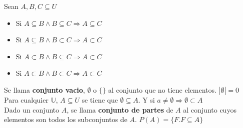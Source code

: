 \documentclass[11pt,a4paper]{article}
\begin{document}
\noindent Sean $A, B, C \subseteq U$
\begin{multicols}{2}
\begin{itemize}
\item Si $A \subseteq B \land B \subseteq C \Rightarrow A \subseteq C$
\item Si $A \subseteq B \land B \subset C \Rightarrow A \subset C$
\item Si $A \subset B \land B \subseteq C \Rightarrow A \subset C$
\item Si $A \subset B \land B \subset C \Rightarrow A \subset C$
\end{itemize}
\end{multicols}

\noindent Se llama \textbf{conjunto vacio}, $\emptyset$ o $\{\}$ al conjunto que no tiene elementos. $|\emptyset| = 0$\\

\noindent Para cualquier $\mathbb{U}$, $A \subseteq U$ se tiene que $\emptyset \subseteq A$. Y si $a \not = \emptyset \Rightarrow \emptyset \subset A$\\


\noindent Dado un conjunto $A$, se llama \textbf{conjunto de partes} de $A$ al conjunto cuyos elementos son todos los subconjuntos de $A$. $P(A) = \{ F . F \subseteq A \}$\\

\newpage
\end{document}

